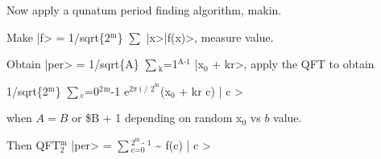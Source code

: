 \documentclass[11pt]{article}
\begin{document}
Now apply a qunatum period finding algorithm, makin.

Make |f> = 1/sqrt\{2$^{\text{m}}$\} $\sum$ |x>|f(x)>, measure value.

Obtain |per> = 1/sqrt\{A\} $\sum$$_{\text{k}}$=1$^{\text{A-1}}$ |x$_{\text{0}}$ + kr>, apply the QFT to
obtain

1/sqrt\{2$^{\text{m}}$\} $\sum$$_{\text{c}}$=0$^{\text{2}}$$^{\text{m}}$-1 e$^{\text{2}\pi\ \text{i / 2}^{\text{m}}}$(x$_{\text{0}}$ + kr c) | c >

when $A = B$ or \$B + 1 depending on random x$_{\text{0}}$ vs $b$ value.

Then QFT$_{\text{2}}^{\text{m}}$ |per> = $\sum$$_{\text{c=0}}^{\text{2}^{\text{m}} \ \text{- 1}}$ \textasciitilde{} f(c) | c >

\section{}
\label{sec-3}
\end{document}
